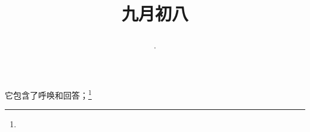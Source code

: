 \title{\date[d=10,m=10,y=2024][year:cn-y,年,month:cn,day:cn,日,·,weekday]·九月初八 }
它包含了呼唤和回答；\footnote{ }

